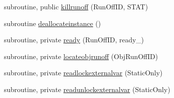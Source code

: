 \begin{DoxyCompactItemize}
subroutine, public \mbox{\hyperlink{namespacemodulerunoff_aa17d0391187f304ab3410eb5d26a4711}{killrunoff}} (Run\+Off\+ID, S\+T\+AT)
\item 
subroutine \mbox{\hyperlink{namespacemodulerunoff_ad9192dfb595b8f16119a042aa13d95c4}{deallocateinstance}} ()
\item 
subroutine, private \mbox{\hyperlink{namespacemodulerunoff_aee0c5b22d517afda2e934847c9da42cb}{ready}} (Run\+Off\+ID, ready\+\_\+)
\item 
subroutine, private \mbox{\hyperlink{namespacemodulerunoff_a573ec5acc76c43856a82166862259a60}{locateobjrunoff}} (Obj\+Run\+Off\+ID)
\item 
subroutine, private \mbox{\hyperlink{namespacemodulerunoff_ae46242484733cacdd1c5d484f4e6eba7}{readlockexternalvar}} (Static\+Only)
\item 
subroutine, private \mbox{\hyperlink{namespacemodulerunoff_a900316fc0130b378405b9b03d84eb9cd}{readunlockexternalvar}} (Static\+Only)
\end{DoxyCompactItemize}
